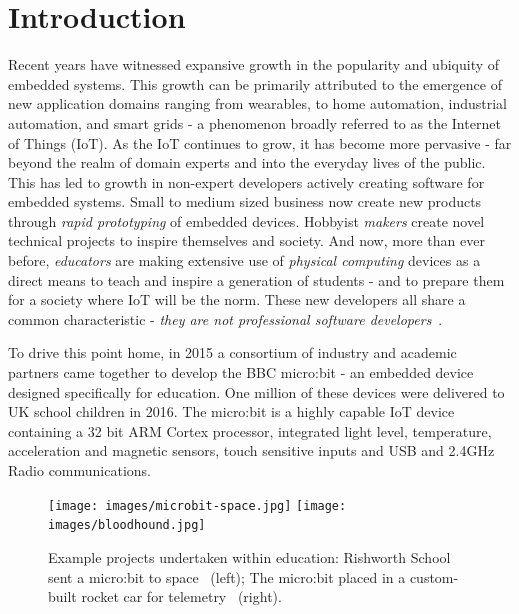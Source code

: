 \section{Introduction}
\label{sec:intro}

Recent years have witnessed expansive growth in the popularity and ubiquity of embedded systems. This growth can be primarily attributed to the emergence of new application domains ranging from wearables, to home automation, industrial automation, and smart grids - a phenomenon broadly referred to as the Internet of Things (IoT). As the IoT continues to grow, it has become more pervasive - far beyond the realm of domain experts and into the everyday lives of the public. This has led to growth in non-expert developers actively creating software for embedded systems. Small to medium sized business now create new products through \emph{rapid prototyping} of embedded devices. Hobbyist \emph{makers} create novel technical projects to inspire themselves and society. And now, more than ever before, \emph{educators} are making extensive use of \emph{physical computing} devices as a direct means to teach and inspire a generation of students - and to prepare them for a society where IoT will be the norm. These new developers all share a common characteristic - \emph{they are not professional software developers}~\cite{dougherty2012maker,bruce2015make,maksimovic2014raspberry}.

To drive this point home, in 2015 a consortium of industry and academic partners came together to develop the BBC micro:bit - an embedded device designed specifically for education. One million of these devices were delivered to UK school children in 2016. The micro:bit is a highly capable IoT device containing a 32 bit ARM Cortex processor, integrated light level, temperature, acceleration and magnetic sensors, touch sensitive inputs and USB and 2.4GHz Radio communications.

\begin{figure}[t]
    \centering
    \texttt{[image: images/microbit-space.jpg]}
    \texttt{[image: images/bloodhound.jpg]}
    \setlength{\belowcaptionskip}{-10pt}
    \caption{\label{fig:projects} Example projects undertaken within education: Rishworth School sent a micro:bit to space~\cite{microbit79:online} (left); The micro:bit placed in a custom-built rocket car for telemetry~\cite{microbit73:online, microsoft:online} (right).}
    \vspace{-5pt}
\end{figure}

